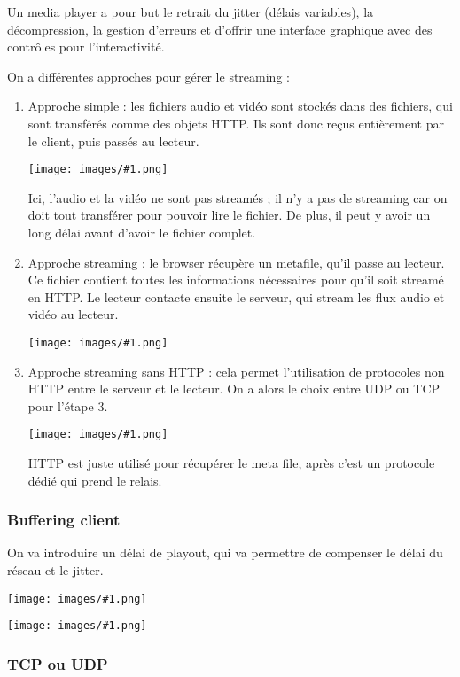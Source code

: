 \documentclass[10pt,a4paper]{report}
\newcommand{\dessin}[1]{\begin{center}\texttt{[image: images/\#1.png]}\end{center}}
\begin{document}
		Un media player a pour but le retrait du jitter (délais variables), la décompression, la gestion d'erreurs et d'offrir une interface graphique avec des contrôles pour l'interactivité.
		
		On a différentes approches pour gérer le streaming :
		
		\begin{enumerate}
			\item Approche simple : les fichiers audio et vidéo sont stockés dans des fichiers, qui sont transférés comme des objets HTTP. Ils sont donc reçus entièrement par le client, puis passés au lecteur.
			
			\dessin{72}
			
			Ici, l'audio et la vidéo ne sont pas streamés ; il n'y a pas de streaming car on doit tout transférer pour pouvoir lire le fichier. De plus, il peut y avoir un long délai avant d'avoir le fichier complet.
			
			\item Approche streaming : le browser récupère un metafile, qu'il passe au lecteur. Ce fichier contient toutes les informations nécessaires pour qu'il soit streamé en HTTP. Le lecteur contacte ensuite le serveur, qui stream les flux audio et vidéo au lecteur.
			
			\dessin{73}
						
			\item Approche streaming sans HTTP : cela permet l'utilisation de protocoles non HTTP entre le serveur et le lecteur. On a alors le choix entre UDP ou TCP pour l'étape 3.
			
			\dessin{74}
			
			HTTP est juste utilisé pour récupérer le meta file, après c'est un protocole dédié qui prend le relais.
		
		\end{enumerate}
		
			\subsubsection{Buffering client}
		
			On va introduire un délai de playout, qui va permettre de compenser le délai du réseau et le jitter.
			
			\dessin{75}
		
			\dessin{76}
		
			\subsubsection{TCP ou UDP}
			
\end{document}
